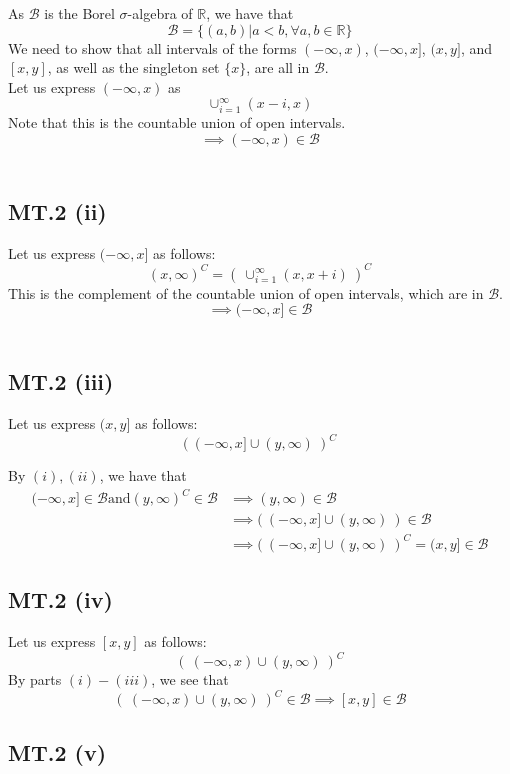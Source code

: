 \documentclass[letterpaper,12pt]{article}
\theoremstyle{definition}
\begin{document}
As $\mathscr{B}$ is the Borel $\sigma$-algebra of $\mathbb{R}$, we have that \[\mathscr{B} = \{(a,b) | a<b, \forall a,b\in \mathbb{R}\}\] We need to show that all intervals of the forms $(-\infty,x)$, $(-\infty,x]$, $(x,y]$, and $[x,y]$, as well as the singleton set $\{x\}$, are all in $\mathscr{B}$. \\
Let us express $(-\infty, x)$ as \[\cup_{i=1}^{\infty}(x-i, x)\]Note that this is the countable union of open intervals. \[ \implies (-\infty, x) \in \mathscr{B}\] \\


\subsection*{MT.2 (ii)}

Let us express $(-\infty, x]$ as follows: \[ (x, \infty)^C = (\ \cup_{i=1}^{\infty}(x, x+i)\ )^C \] This is the complement of the countable union of open intervals, which are in $\mathscr{B}$. \[ \implies (-\infty, x] \in \mathscr{B}\] \\

\subsection*{MT.2 (iii)}

Let us express $(x,y]$ as follows: \[ (\ (-\infty, x] \cup (y, \infty)\ )^C \]

By $(i),(ii)$, we have that 
\begin{align*}
(-\infty,x] \in \mathscr{B} \text{and} (y, \infty)^{C} \in \mathscr{B} &\implies (y, \infty) \in \mathscr{B}
\\&\implies (\ (-\infty, x] \cup (y, \infty)\ ) \in \mathscr{B} \\&\implies (\ (-\infty, x] \cup (y, \infty)\ )^C=(x,y] \in \mathscr{B}
\end{align*} 

\subsection*{MT.2 (iv)}

Let us express $[x,y]$ as follows:
\[ (\ (-\infty, x) \cup (y, \infty)\ )^C\]By parts $(i)-(iii)$, we see that \[(\ (-\infty, x) \cup (y, \infty)\ )^C \in \mathscr{B} \implies [x,y] \in \mathscr{B}\]

\subsection*{MT.2 (v)}
\end{document}
